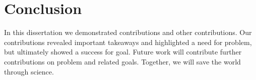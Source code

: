
\chapter{Conclusion}
\label{ch:conclusion}

 In this dissertation we demonstrated contributions and other contributions.
 Our contributions revealed important takeaways and highlighted a need for problem, but ultimately showed a success for goal.
 Future work will contribute further contributions on problem and related goals.
 Together, we will save the world through science.

\endinput
